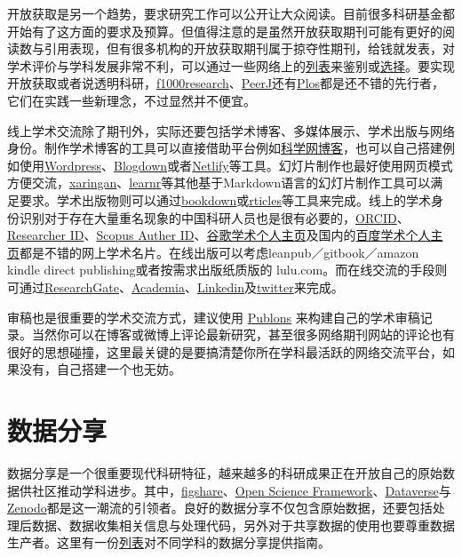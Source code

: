 \documentclass[]{tufte-book}
\begin{document}
开放获取是另一个趋势，要求研究工作可以公开让大众阅读。目前很多科研基金都开始有了这方面的要求及预算。但值得注意的是虽然开放获取期刊可能有更好的阅读数与引用表现，但有很多机构的开放获取期刊属于掠夺性期刊，给钱就发表，对学术评价与学科发展非常不利，可以通过一些网络上的\href{https://beallslist.net/}{列表}来鉴别或\href{https://doaj.org}{选择}。要实现开放获取或者说透明科研，\href{https://f1000research.com/}{f1000research}、\href{https://peerj.org/}{PeerJ}还有\href{https://www.plos.org/}{Plos}都是还不错的先行者，它们在实践一些新理念，不过显然并不便宜。

线上学术交流除了期刊外，实际还要包括学术博客、多媒体展示、学术出版与网络身份。制作学术博客的工具可以直接借助平台例如\href{http://blog.sciencenet.cn/}{科学网博客}，也可以自己搭建例如使用\href{https://zh-cn.wordpress.com/}{Wordpress}、\href{https://bookdown.org/yihui/blogdown/}{Blogdown}或者\href{https://www.netlify.com/}{Netlify}等工具。幻灯片制作也最好使用网页模式方便交流，\href{https://github.com/yihui/xaringan}{xaringan}、\href{https://rstudio.github.io/learnr/}{learnr}等其他基于Markdown语言的幻灯片制作工具可以满足要求。学术出版物则可以通过\href{https://bookdown.org/}{bookdown}或\href{https://github.com/rstudio/rticles}{rticles}等工具来完成。线上的学术身份识别对于存在大量重名现象的中国科研人员也是很有必要的，\href{https://orcid.org/}{ORCID}、\href{http://www.researcherid.com/}{Researcher ID}、\href{https://www.scopus.com/}{Scopus Auther ID}、\href{https://scholar.google.com}{谷歌学术个人主页}及国内的\href{https://xueshu.baidu.com/}{百度学术个人主页}都是不错的网上学术名片。在线出版可以考虑leanpub／gitbook／amazon kindle direct publishing或者按需求出版纸质版的 lulu.com。而在线交流的手段则可通过\href{https://www.researchgate.net/}{ResearchGate}、\href{https://www.academia.edu/}{Academia}、\href{https://www.linkedin.com/}{Linkedin}及\href{https://twitter.com/}{twitter}来完成。

审稿也是很重要的学术交流方式，建议使用 \href{https://publons.com/home/}{Publons} 来构建自己的学术审稿记录。当然你可以在博客或微博上评论最新研究，甚至很多网络期刊网站的评论也有很好的思想碰撞，这里最关键的是要搞清楚你所在学科最活跃的网络交流平台，如果没有，自己搭建一个也无妨。

\hypertarget{ux6570ux636eux5206ux4eab}{%
\section*{数据分享}\label{ux6570ux636eux5206ux4eab}}

数据分享是一个很重要现代科研特征，越来越多的科研成果正在开放自己的原始数据供社区推动学科进步。其中，\href{https://figshare.com/}{figshare}、\href{https://osf.io/}{Open Science Framework}、\href{https://dataverse.org/}{Dataverse}与\href{https://zenodo.org/}{Zenodo}都是这一潮流的引领者。良好的数据分享不仅包含原始数据，还要包括处理后数据、数据收集相关信息与处理代码，另外对于共享数据的使用也要尊重数据生产者。这里有一份\href{https://www.nature.com/sdata/policies/repositories}{列表}对不同学科的数据分享提供指南。
\end{document}
